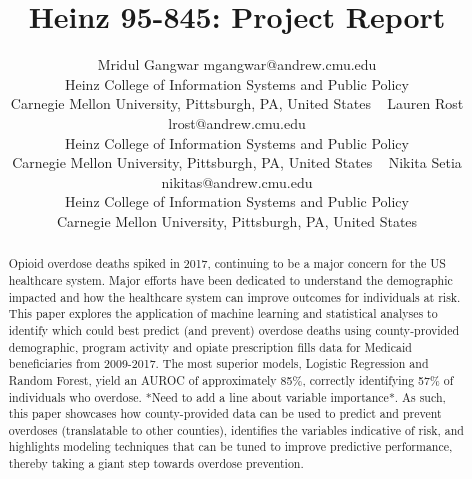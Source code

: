 \documentclass[twoside,10.5pt]{article}
\begin{document}
\title{Heinz 95-845: Project Report}

\author{\name Mridul Gangwar \email mgangwar@andrew.cmu.edu \\
       \addr Heinz College of Information Systems and Public Policy\\
       Carnegie Mellon University, Pittsburgh, PA, United States \
       \AND
       \name Lauren Rost \email lrost@andrew.cmu.edu \\
       \addr Heinz College of Information Systems and Public Policy\\
       Carnegie Mellon University, Pittsburgh, PA, United States \
       \AND
       \name Nikita Setia \email nikitas@andrew.cmu.edu \\
       \addr Heinz College of Information Systems and Public Policy\\
       Carnegie Mellon University, Pittsburgh, PA, United States}
       
\maketitle

\begin{abstract}
Opioid overdose deaths spiked in 2017, continuing to be a major concern for the US healthcare system. Major efforts have been dedicated to understand the demographic impacted and how the healthcare system can improve outcomes for individuals at risk. This paper explores the application of machine learning and statistical analyses to identify which could best predict (and prevent) overdose deaths using county-provided demographic, program activity and opiate prescription fills data for Medicaid beneficiaries from 2009-2017. The most superior models, Logistic Regression and Random Forest, yield an AUROC of approximately 85\%, correctly identifying 57\% of individuals who overdose. *Need to add a line about variable importance*. As such, this paper showcases how county-provided data can be used to predict and prevent overdoses (translatable to other counties), identifies the variables indicative of risk, and highlights modeling techniques that can be tuned to improve predictive performance, thereby taking a giant step towards overdose prevention.  
\end{abstract}
\end{document}
